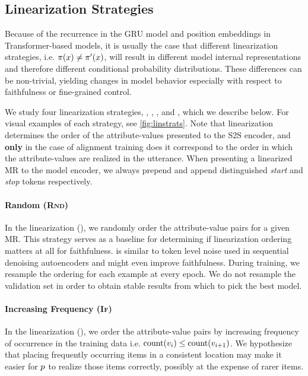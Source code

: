 \subsection{Linearization Strategies}
\label{sec:linstrats}

Because of the recurrence in the GRU model and position embeddings in
Transformer-based models, it is usually the case that different linearization
strategies, i.e.  $\pi(x) \ne \pi^\prime(x)$, will result in different
model internal representations and therefore different conditional probability
distributions. These differences can be non-trivial, yielding changes in model
behavior especially with respect to faithfulness or fine-grained control.

We study four linearization strategies, , , , and , which we describe below. For visual examples of each
strategy, see \autoref{fig:linstrats}.  Note that linearization determines the
order of the attribute-values presented to the S2S encoder, and \textbf{only} in the
case of alignment training does it correspond to the order in which the
attribute-values are realized in the utterance. When presenting a linearized
MR to the model encoder, we always prepend and append distinguished
\textit{start} and \textit{stop} tokens respectively.



\paragraph{Random (\textsc{Rnd})} In the  linearization
(), we randomly order the attribute-value pairs for a given MR.
This strategy serves as a baseline for determining if linearization ordering
matters at all for faithfulness.  is similar to token level noise
used in sequential denoising autoencoders \cite{wang2019} and might
even improve faithfulness.  During training, we resample the ordering for each
example at every epoch.  We do not resample the validation set in order to
obtain stable results from which to pick the best model.

\paragraph{Increasing Frequency (\textsc{If})} In the  linearization (), we order the attribute-value pairs by
increasing frequency of occurrence in the training data i.e. $\operatorname{count}(v_i)
\le \operatorname{count}(v_{i+1})$.  We hypothesize that placing frequently occurring
items in a consistent location may make it easier for $p$ to realize
those items correctly, possibly at the expense of rarer items.

